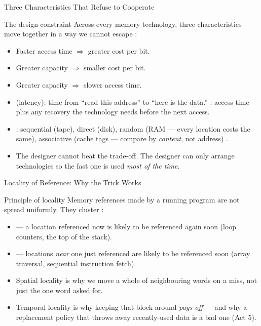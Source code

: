 \documentclass[aspectratio=169]{beamer}
\begin{document}
\begin{frame}{Three Characteristics That Refuse to Cooperate}
  \small
  \begin{block}{The design constraint}
    Across every memory technology, three characteristics move together in a
    way we cannot escape
    \cite[Ch.~4, printed pp.~112--137]{Stallings2015_computer_organization}:
    \begin{itemize}
      \item Faster access time $\Rightarrow$ greater cost per bit.
      \item Greater capacity $\Rightarrow$ smaller cost per bit.
      \item Greater capacity $\Rightarrow$ slower access time.
    \end{itemize}
  \end{block}
  \begin{itemize}
    \item {} (latency): time from ``read this address'' to
      ``here is the data.'' : access time plus any
      recovery the technology needs before the next access.
    \item {}: sequential (tape), direct (disk), random
      (RAM --- every location costs the same), associative (cache tags ---
      compare by \emph{content}, not address)
      \cite[Table~4.1, PDF p.~156]{Stallings2015_computer_organization}.
    \item The designer cannot beat the trade-off. The designer can only
      arrange technologies so the fast one is used \emph{most of the time}.
  \end{itemize}
\end{frame}

\begin{frame}{Locality of Reference: Why the Trick Works}
  \begin{block}{Principle of locality}
    Memory references made by a running program are not spread uniformly.
    They cluster
    \cite[\S4.1, printed pp.~112--117]{Stallings2015_computer_organization}:
    \begin{itemize}
      \item {} --- a location referenced now is likely
        to be referenced again soon (loop counters, the top of the stack).
      \item {} --- locations \emph{near} one just
        referenced are likely to be referenced soon (array traversal,
        sequential instruction fetch).
    \end{itemize}
  \end{block}
  \begin{itemize}
    \item Spatial locality is why we move a whole  of neighbouring
      words on a miss, not just the one word asked for.
    \item Temporal locality is why keeping that block around \emph{pays off}
      --- and why a replacement policy that throws away recently-used data is
      a bad one (Act 5).
  \end{itemize}
\end{frame}
\end{document}
